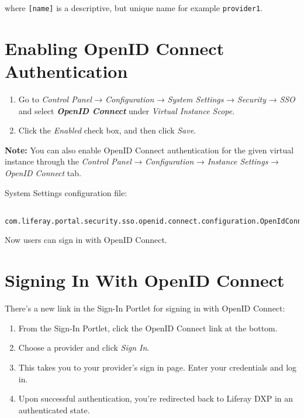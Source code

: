 where \texttt{{[}name{]}} is a descriptive, but unique name for example
\texttt{provider1}.

\noindent\hrulefill

\section{Enabling OpenID Connect
Authentication}\label{enabling-openid-connect-authentication}

\begin{enumerate}
\def\labelenumi{\arabic{enumi}.}
\item
  Go to \emph{Control Panel} → \emph{Configuration} → \emph{System
  Settings} → \emph{Security} → \emph{SSO} and select
  \textbf{\emph{OpenID Connect}} under \emph{Virtual Instance Scope}.
\item
  Click the \emph{Enabled} check box, and then click \emph{Save}.
\end{enumerate}

\textbf{Note:} You can also enable OpenID Connect authentication for the
given virtual instance through the \emph{Control Panel} →
\emph{Configuration} → \emph{Instance Settings} → \emph{OpenID Connect}
tab.

\noindent\hrulefill

System Settings configuration file:

\begin{verbatim}
 com.liferay.portal.security.sso.openid.connect.configuration.OpenIdConnectConfiguration.config
\end{verbatim}

\noindent\hrulefill

Now users can sign in with OpenID Connect.

\section{Signing In With OpenID
Connect}\label{signing-in-with-openid-connect}

There's a new link in the Sign-In Portlet for signing in with OpenID
Connect:

\begin{enumerate}
\def\labelenumi{\arabic{enumi}.}
\item
  From the Sign-In Portlet, click the OpenID Connect link at the bottom.
\item
  Choose a provider and click \emph{Sign In}.
\item
  This takes you to your provider's sign in page. Enter your credentials
  and log in.
\item
  Upon successful authentication, you're redirected back to Liferay DXP
  in an authenticated state.
\end{enumerate}

